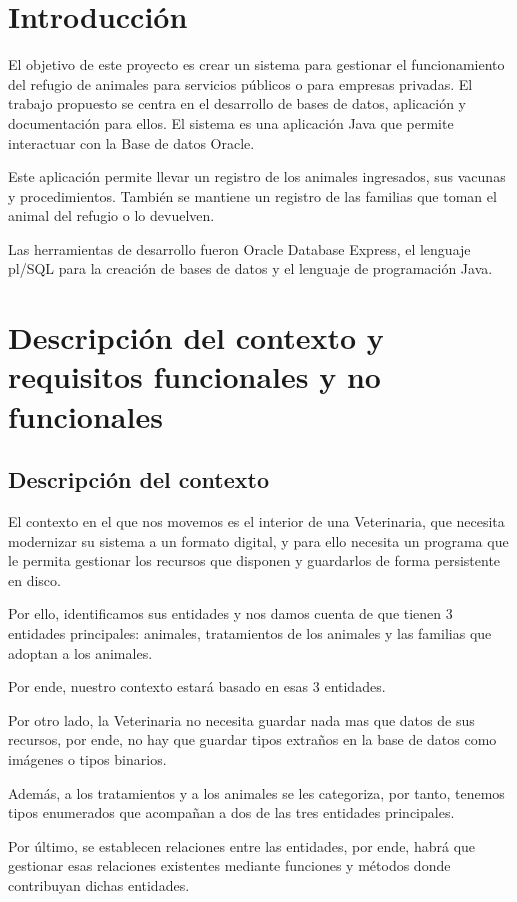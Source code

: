 \documentclass{FR16}
\begin{document}
\maketitle

\tableofcontents
\newpage

\section{Introducción}
El objetivo de este proyecto es crear un sistema para gestionar el funcionamiento del refugio de animales para servicios públicos o para empresas privadas. El trabajo propuesto se centra en el desarrollo de bases de datos, aplicación y documentación para ellos. El sistema es una aplicación Java que permite interactuar con la Base de datos Oracle.

Este aplicación permite llevar un registro de los animales ingresados, sus vacunas y procedimientos. También se mantiene un registro de las familias que toman el animal del refugio o lo devuelven.

Las herramientas de desarrollo fueron Oracle Database Express, el lenguaje pl/SQL para la creación de bases de datos y el lenguaje de programación Java.

\newpage

\section{Descripción del contexto y requisitos funcionales y no funcionales}
\subsection{Descripción del contexto}
\begin{justify}
El contexto en el que nos movemos es el interior de una Veterinaria, que necesita modernizar su sistema a un formato digital, y para ello necesita un programa que le permita gestionar los recursos que disponen y guardarlos de forma persistente en disco.

Por ello, identificamos sus entidades y nos damos cuenta de que tienen 3 entidades principales: animales, tratamientos de los animales y las familias que adoptan a los animales.

Por ende, nuestro contexto estará basado en esas 3 entidades.

Por otro lado, la Veterinaria no necesita guardar nada mas que datos de sus recursos, por ende, no hay que guardar tipos extraños en la base de datos como imágenes o tipos binarios.

Además, a los tratamientos y a los animales se les categoriza, por tanto, tenemos tipos enumerados que acompañan a dos de las tres entidades principales.

Por último, se establecen relaciones entre las entidades, por ende, habrá que gestionar esas relaciones existentes mediante funciones y métodos donde contribuyan dichas entidades.
\end{justify}
\end{document}
